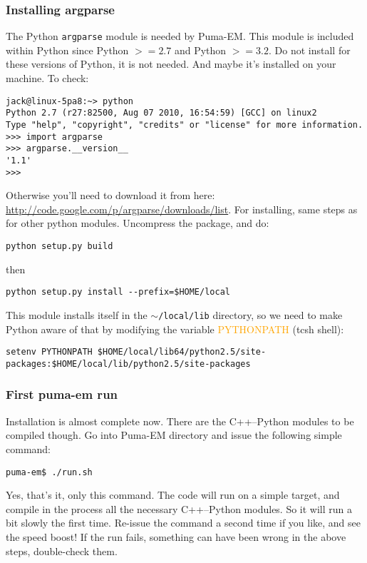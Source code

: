 \documentclass[a4paper,10pt]{book}
\newcommand{\parameter}[1] {\textcolor{orange}{\textsf{#1}}}
\begin{document}
\subsubsection{Installing argparse}
%
\par
The Python \texttt{argparse} module is needed by Puma-EM. This module is included within Python since Python $>= 2.7$ and Python $>= 3.2$. Do not install for these versions of Python, it is not needed. And maybe it's installed on your machine. To check:
\begin{verbatim}
jack@linux-5pa8:~> python
Python 2.7 (r27:82500, Aug 07 2010, 16:54:59) [GCC] on linux2
Type "help", "copyright", "credits" or "license" for more information.
>>> import argparse
>>> argparse.__version__
'1.1'
>>> 
\end{verbatim}
%
\par
Otherwise you'll need to download it from here: \url{http://code.google.com/p/argparse/downloads/list}. For installing, same steps as for other python modules. Uncompress the package, and do:
\begin{verbatim}
python setup.py build
\end{verbatim}
then
\begin{verbatim}
python setup.py install --prefix=$HOME/local
\end{verbatim}
%
\par
This module installs itself in the \texttt{$\sim$/local/lib} directory, so we need to make Python aware of that by modifying the variable \parameter{PYTHONPATH} (tcsh shell):
\begin{verbatim}
setenv PYTHONPATH $HOME/local/lib64/python2.5/site-packages:$HOME/local/lib/python2.5/site-packages
\end{verbatim}

\subsubsection{First puma-em run}
%
\par
Installation is almost complete now. There are the C++--Python modules to be compiled though. Go into Puma-EM directory and issue the following simple command:
\begin{verbatim}
puma-em$ ./run.sh
\end{verbatim}
Yes, that's it, only this command. The code will run on a simple target, and compile in the process all the necessary C++--Python modules. So it will run a bit slowly the first time. Re-issue the command a second time if you like, and see the speed boost! If the run fails, something can have been wrong in the above steps, double-check them.
\end{document}
